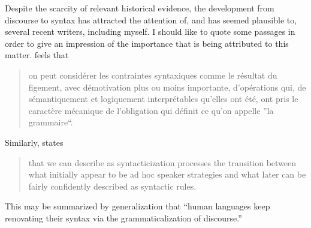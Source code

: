 Despite the scarcity of relevant historical evidence, the development from discourse to syntax has attracted the attention of, and has seemed plausible to, several recent writers, including myself. I should like to quote some passages in order to give an impression of the importance that is being attributed to this matter. \citet[22]{Hagège1978} feels that

\begin{quote} \label{Hagege}
on peut considérer les contraintes syntaxiques comme le résultat du figement, avec démotivation plus ou moins importante, d'opérations qui, de sémantiquement et logiquement interprétables qu'elles ont été, ont pris le caractère mécanique de l'obligation qui définit ce qu'on appelle ”la grammaire“.
\end{quote}

\noindent Similarly, \citet[62]{Sankoff1977} states

\begin{quote}
that we can describe as syntacticization processes the transition between what initially appear to be ad hoc speaker strategies and what later can be fairly confidently described as syntactic rules.
\end{quote}

This may be summarized by \citet[107]{Givón1979} generalization that “human languages keep renovating their syntax via the grammaticalization of discourse.”

